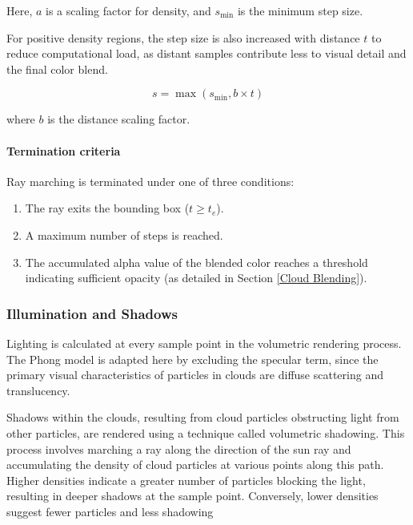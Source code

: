  Here, $a$ is a scaling factor for density, and $s_{\text{min}}$ is the minimum step size.

For positive density regions, the step size is also increased with distance $t$ to reduce computational load, as distant samples contribute less to visual detail and the final color blend.

\begin{equation}
     s = \max(s_{\text{min}}, b \times t)
\end{equation}

where $b$ is the distance scaling factor.

\paragraph{Termination criteria}

Ray marching is terminated under one of three conditions: 

\begin{enumerate}
    \item The ray exits the bounding box ($t\ge t_e$).
    \item A maximum number of steps is reached.
    \item The accumulated alpha value of the blended color reaches a threshold indicating sufficient opacity (as detailed in Section \ref{Cloud Blending}).
\end{enumerate}

\subsubsection{Illumination and Shadows}

Lighting is calculated at every sample point in the volumetric rendering process. The Phong model \cite{phong_illumination_1975} is adapted here by excluding the specular term, since the primary visual characteristics of particles in clouds are diffuse scattering and translucency. 

Shadows within the clouds, resulting from cloud particles obstructing light from other particles, are rendered using a technique called volumetric shadowing. This process involves marching a ray along the direction of the sun ray and accumulating the density of cloud particles at various points along this path. Higher densities indicate a greater number of particles blocking the light, resulting in deeper shadows at the sample point. Conversely, lower densities suggest fewer particles and less shadowing

